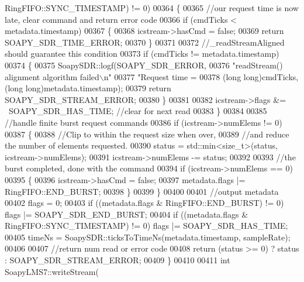 \begin{DoxyCode}
      RingFIFO::SYNC_TIMESTAMP) != 0)
00364     \{
00365         \textcolor{comment}{//our request time is now late, clear command and return error code}
00366         \textcolor{keywordflow}{if} (cmdTicks < metadata.timestamp)
00367         \{
00368             icstream->hasCmd = \textcolor{keyword}{false};
00369             \textcolor{keywordflow}{return} SOAPY_SDR_TIME_ERROR;
00370         \}
00371 
00372         \textcolor{comment}{//\_readStreamAligned should guarantee this condition}
00373         \textcolor{keywordflow}{if} (cmdTicks != metadata.timestamp)
00374         \{
00375             SoapySDR::logf(SOAPY_SDR_ERROR,
00376                 \textcolor{stringliteral}{"readStream() alignment algorithm failed\(\backslash\)n"}
00377                 \textcolor{stringliteral}{"Request time = %
00378                 (\textcolor{keywordtype}{long} \textcolor{keywordtype}{long})cmdTicks, (\textcolor{keywordtype}{long} \textcolor{keywordtype}{long})metadata.timestamp);
00379             \textcolor{keywordflow}{return} SOAPY_SDR_STREAM_ERROR;
00380         \}
00381 
00382         icstream->flags &= ~SOAPY_SDR_HAS_TIME; \textcolor{comment}{//clear for next read}
00383     \}
00384 
00385     \textcolor{comment}{//handle finite burst request commands}
00386     \textcolor{keywordflow}{if} (icstream->numElems != 0)
00387     \{
00388         \textcolor{comment}{//Clip to within the request size when over,}
00389         \textcolor{comment}{//and reduce the number of elements requested.}
00390         status = std::min<size\_t>(status, icstream->numElems);
00391         icstream->numElems -= status;
00392 
00393         \textcolor{comment}{//the burst completed, done with the command}
00394         \textcolor{keywordflow}{if} (icstream->numElems == 0)
00395         \{
00396             icstream->hasCmd = \textcolor{keyword}{false};
00397             metadata.flags |= RingFIFO::END_BURST;
00398         \}
00399     \}
00400 
00401     \textcolor{comment}{//output metadata}
00402     flags = 0;
00403     \textcolor{keywordflow}{if} ((metadata.flags & RingFIFO::END_BURST) != 0) flags |= 
      SOAPY_SDR_END_BURST;
00404     \textcolor{keywordflow}{if} ((metadata.flags & RingFIFO::SYNC_TIMESTAMP) != 0) flags |= 
      SOAPY_SDR_HAS_TIME;
00405     timeNs = SoapySDR::ticksToTimeNs(metadata.timestamp, sampleRate);
00406 
00407     \textcolor{comment}{//return num read or error code}
00408     \textcolor{keywordflow}{return} (status >= 0) ? status : SOAPY_SDR_STREAM_ERROR;
00409 \}
00410 
00411 \textcolor{keywordtype}{int} SoapyLMS7::writeStream(
}
\end{DoxyCode}
